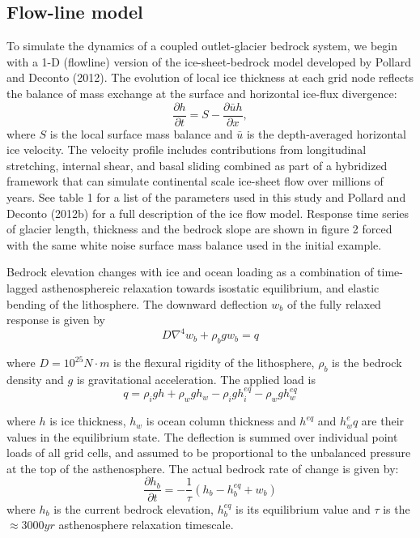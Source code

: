 \documentclass[tc, manuscript]{copernicus}
\begin{document}
\subsection{Flow-line model}
To simulate the dynamics of a coupled outlet-glacier bedrock system, we begin with a 1-D (flowline) version of the ice-sheet-bedrock model developed by Pollard and Deconto (2012). The evolution of local ice thickness at each grid node reflects the balance of mass exchange at the surface and horizontal ice-flux divergence: 
\begin{equation}
\frac{\partial h}{\partial t} = S - \frac{\partial \bar{u}h}{\partial x},
\end{equation}
where $S$ is the local surface mass balance and $\bar{u}$ is the depth-averaged horizontal ice velocity. The velocity profile includes contributions from longitudinal stretching, internal shear, and basal sliding combined as part of a hybridized framework that can simulate continental scale ice-sheet flow over millions of years.
See table 1 for a list of the parameters used in this study and Pollard and Deconto (2012b) for a full description of the ice flow model. 
Response time series of glacier length, thickness and the bedrock slope are shown in figure 2 forced with the same white noise surface mass balance used in the initial example.

Bedrock elevation changes with ice and ocean loading as a combination of time-lagged asthenosphereic relaxation towards isostatic equilibrium, and elastic bending of the lithosphere. The downward deflection $w_b$ of the fully relaxed response is given by 
\begin{equation}
D\nabla^4 w_b + \rho_b g w_b = q
\end{equation}

where $D = 10^{25} N\cdot m$ is the flexural rigidity of the lithosphere, $\rho_b$ is the bedrock density and $g$ is gravitational acceleration. The applied load is 
\begin{equation}
q = \rho_i g h + \rho_w g h_w - \rho_i g h_i^{eq} - \rho_w g h_w^{eq} 
\end{equation}

where $h$ is ice thickness, $h_w$ is ocean column thickness and $h^{eq}$ and $h_w^eq$ are their values in the equilibrium state. The deflection is summed over individual point loads of all grid cells, and assumed to be proportional to the unbalanced pressure at the top of the asthenosphere. The actual bedrock rate of change is given by:
\begin{equation}
\frac{\partial h_b}{\partial t} = -\frac{1}{\tau} \left(h_b - h_b^{eq} + w_b \right)
\end{equation}
where $h_b$ is the current bedrock elevation, $h_b^{eq}$ is its equilibrium value and $\tau$ is the $\approx 3000yr$ asthenosphere relaxation timescale.
\end{document}
